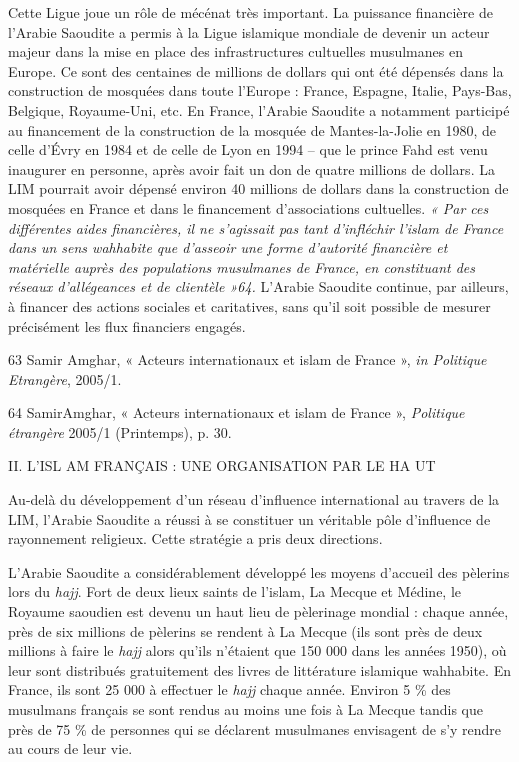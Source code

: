 Cette Ligue joue un rôle de mécénat très important. La puissance
financière de l'Arabie Saoudite a permis à la Ligue islamique mondiale
de devenir un acteur majeur dans la mise en place des infrastructures
cultuelles musulmanes en Europe. Ce sont des centaines de millions de
dollars qui ont été dépensés dans la construction de mosquées dans toute
l'Europe : France, Espagne, Italie, Pays-Bas, Belgique, Royaume-Uni,
etc. En France, l'Arabie Saoudite a notamment participé au financement
de la construction de la mosquée de Mantes-la-Jolie en 1980, de celle
d'Évry en 1984 et de celle de Lyon en 1994 -- que le prince Fahd est
venu inaugurer en personne, après avoir fait un don de quatre millions
de dollars. La LIM pourrait avoir dépensé environ 40 millions de dollars
dans la construction de mosquées en France et dans le financement
d'associations cultuelles. \emph{« Par ces différentes aides
financières, il ne s'agissait pas tant d'infléchir l'islam de France
dans un sens wahhabite que d'asseoir une forme d'autorité financière et
matérielle auprès des populations musulmanes de France, en constituant
des réseaux d'allégeances et de clientèle »64.} L'Arabie Saoudite
continue, par ailleurs, à financer des actions sociales et caritatives,
sans qu'il soit possible de mesurer précisément les flux financiers
engagés.

63 Samir Amghar, « Acteurs internationaux et islam de France », \emph{in
Politique Etrangère}, 2005/1.

64 SamirAmghar, « Acteurs internationaux et islam de France »,
\emph{Politique étrangère} 2005/1 (Printemps), p. 30.

II. L'ISL AM FRANÇAIS : UNE ORGANISATION PAR LE HA UT

Au-delà du développement d'un réseau d'influence international au
travers de la LIM, l'Arabie Saoudite a réussi à se constituer un
véritable pôle d'influence de rayonnement religieux. Cette stratégie a
pris deux directions.

L'Arabie Saoudite a considérablement développé les moyens d'accueil des
pèlerins lors du \emph{hajj}. Fort de deux lieux saints de l'islam, La
Mecque et Médine, le Royaume saoudien est devenu un haut lieu de
pèlerinage mondial : chaque année, près de six millions de pèlerins se
rendent à La Mecque (ils sont près de deux millions à faire le
\emph{hajj} alors qu'ils n'étaient que 150 000 dans les années 1950), où
leur sont distribués gratuitement des livres de littérature islamique
wahhabite. En France, ils sont 25 000 à effectuer le \emph{hajj} chaque
année. Environ 5 \% des musulmans français se sont rendus au moins une
fois à La Mecque tandis que près de 75 \% de personnes qui se déclarent
musulmanes envisagent de s'y rendre au cours de leur vie.

